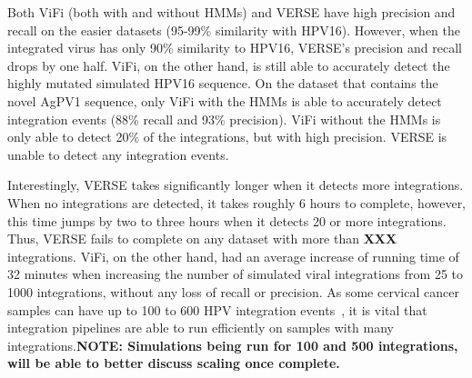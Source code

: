 \documentclass[11pt]{article}
\begin{document}
Both ViFi (both with and without HMMs) and VERSE have high precision and recall on the easier datasets (95-99\% similarity with HPV16).  However, when the integrated virus has only 90\% similarity to HPV16, VERSE's precision and recall drops by one half.  ViFi, on the other hand, is still able to accurately detect the highly mutated simulated HPV16 sequence.  On the dataset that contains the novel AgPV1 sequence, only ViFi with the HMMs is able to accurately detect integration events (88\% recall and 93\% precision).  ViFi without the HMMs is only able to detect 20\% of the integrations, but with high precision.  VERSE is unable to detect any integration events.  

Interestingly, VERSE takes significantly longer when it detects more integrations.  When no integrations are detected, it takes roughly 6 hours to complete, however, this time jumps by two to three hours when it detects 20 or more integrations.  Thus, VERSE fails to complete on any dataset with more than \textbf{XXX} integrations.  ViFi, on the other hand, had an average increase of running time of 32 minutes when increasing the number of simulated viral integrations from 25 to 1000 integrations, without any loss of recall or precision.  As some cervical cancer samples can have up to 100 to 600 HPV integration events~\cite{Hu2015}, it is vital that integration pipelines are able to run efficiently on samples with many integrations.\textbf{NOTE:  Simulations being run for 100 and 500 integrations, will be able to better discuss scaling once complete.}

\end{document}
